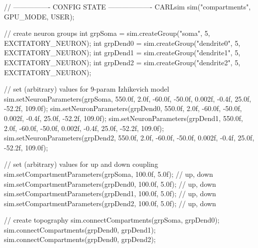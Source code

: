 \begin{DoxyCode}
\textcolor{comment}{// ---------------- CONFIG STATE -------------------}
CARLsim sim(\textcolor{stringliteral}{"compartments"}, GPU\_MODE, USER);

\textcolor{comment}{// create neuron groups}
\textcolor{keywordtype}{int} grpSoma = sim.createGroup(\textcolor{stringliteral}{"soma"}, 5, EXCITATORY\_NEURON);
\textcolor{keywordtype}{int} grpDend0 = sim.createGroup(\textcolor{stringliteral}{"dendrite0"}, 5, EXCITATORY\_NEURON);
\textcolor{keywordtype}{int} grpDend1 = sim.createGroup(\textcolor{stringliteral}{"dendrite1"}, 5, EXCITATORY\_NEURON);
\textcolor{keywordtype}{int} grpDend2 = sim.createGroup(\textcolor{stringliteral}{"dendrite2"}, 5, EXCITATORY\_NEURON);

\textcolor{comment}{// set (arbitrary) values for 9-param Izhikevich model}
sim.setNeuronParameters(grpSoma, 550.0f, 2.0f, -60.0f, -50.0f, 0.002f, -0.4f, 25.0f, -52.2f, 109.0f);
sim.setNeuronParameters(grpDend0, 550.0f, 2.0f, -60.0f, -50.0f, 0.002f, -0.4f, 25.0f, -52.2f, 109.0f);
sim.setNeuronParameters(grpDend1, 550.0f, 2.0f, -60.0f, -50.0f, 0.002f, -0.4f, 25.0f, -52.2f, 109.0f);
sim.setNeuronParameters(grpDend2, 550.0f, 2.0f, -60.0f, -50.0f, 0.002f, -0.4f, 25.0f, -52.2f, 109.0f);

\textcolor{comment}{// set (arbitrary) values for up and down coupling}
sim.setCompartmentParameters(grpSoma, 100.0f, 5.0f); \textcolor{comment}{// up, down}
sim.setCompartmentParameters(grpDend0, 100.0f, 5.0f); \textcolor{comment}{// up, down}
sim.setCompartmentParameters(grpDend1, 100.0f, 5.0f); \textcolor{comment}{// up, down}
sim.setCompartmentParameters(grpDend2, 100.0f, 5.0f); \textcolor{comment}{// up, down}

\textcolor{comment}{// create topography}
sim.connectCompartments(grpSoma, grpDend0);
sim.connectCompartments(grpDend0, grpDend1);
sim.connectCompartments(grpDend0, grpDend2);
\end{DoxyCode}


